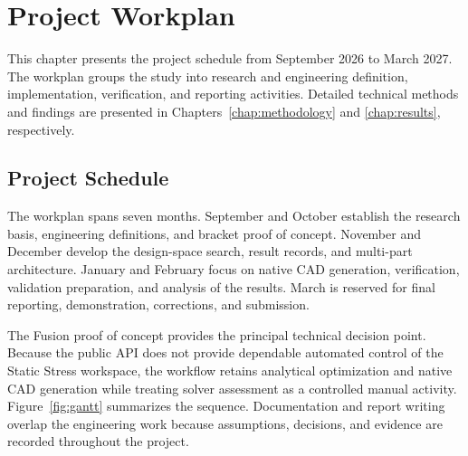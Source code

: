 \chapter{Project Workplan}
\label{chap:workplan}

This chapter presents the project schedule from September 2026 to March 2027.
The workplan groups the study into research and engineering definition,
implementation, verification, and reporting activities. Detailed technical
methods and findings are presented in Chapters~\ref{chap:methodology} and
\ref{chap:results}, respectively.

\section{Project Schedule}
\label{sec:workplan}

The workplan spans seven months. September and October establish the research
basis, engineering definitions, and bracket proof of concept. November and
December develop the design-space search, result records, and multi-part
architecture. January and February focus on native CAD generation,
verification, validation preparation, and analysis of the results. March is
reserved for final reporting, demonstration, corrections, and submission.

The Fusion proof of concept provides the principal technical decision point.
Because the public API does not provide dependable automated control of the
Static Stress workspace, the workflow retains analytical optimization and
native CAD generation while treating solver assessment as a controlled manual
activity. Figure~\ref{fig:gantt} summarizes the sequence. Documentation and
report writing overlap the engineering work because assumptions, decisions,
and evidence are recorded throughout the project.

